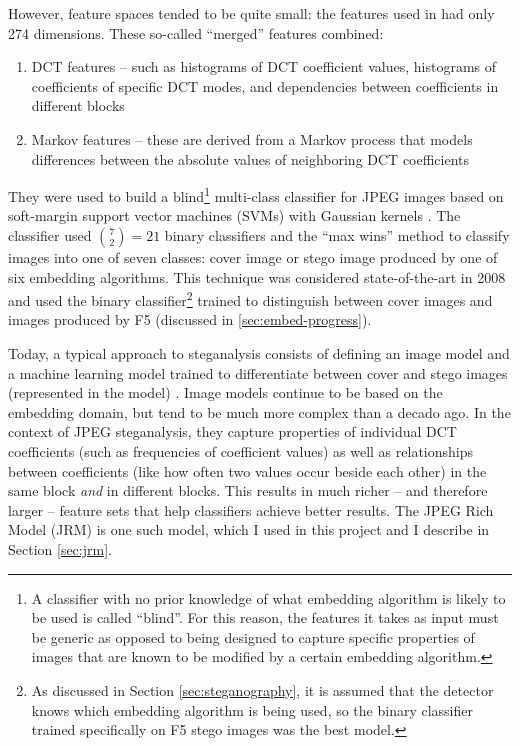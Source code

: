 \documentclass[11pt,a4paper,twoside,openright]{report}
\begin{document}
However, feature spaces tended to be quite small: the features used in \cite{2008-paper} had only 274 dimensions. These so-called ``merged'' features combined:
\begin{enumerate}
  \item DCT features -- such as histograms of DCT coefficient values, histograms of coefficients of specific DCT modes, and dependencies between coefficients in different blocks
  \item Markov features -- these are derived from a Markov process that models differences between the absolute values of neighboring DCT coefficients
\end{enumerate}
They were used to build a blind\footnote{A classifier with no prior knowledge of what embedding algorithm is likely to be used is called ``blind''. For this reason, the features it takes as input must be generic as opposed to being designed to capture specific properties of images that are known to be modified by a certain embedding algorithm.} multi-class classifier for JPEG images based on soft-margin support vector machines (SVMs) with Gaussian kernels \cite{2008-features}. The classifier used $\binom{7}{2}=21$ binary classifiers and the ``max wins'' method to classify images into one of seven classes: cover image or stego image produced by one of six embedding algorithms. This technique was considered state-of-the-art in 2008 and \cite{2008-paper} used the binary classifier\footnote{As discussed in Section \ref{sec:steganography}, it is assumed that the detector knows which embedding algorithm is being used, so the binary classifier trained specifically on F5 stego images was the best model.} trained to distinguish between cover images and images produced by F5 (discussed in \ref{sec:embed-progress}).

Today, a typical approach to steganalysis consists of defining an image model and a machine learning model trained to differentiate between cover and stego images (represented in the model) \cite{jrm-paper}. Image models continue to be based on the embedding domain, but tend to be much more complex than a decado ago. In the context of JPEG steganalysis, they capture properties of individual DCT coefficients (such as frequencies of coefficient values) as well as relationships between coefficients (like how often two values occur beside each other) in the same block \textit{and} in different blocks. This results in much richer -- and therefore larger -- feature sets that help classifiers achieve better results. The JPEG Rich Model (JRM) is one such model, which I used in this project and I describe in Section \ref{sec:jrm}.
\end{document}
